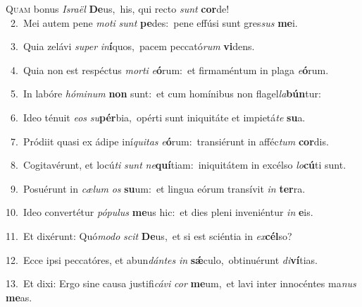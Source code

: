 \lettrine{\initial\textcolor{\initialcolor}{Q}}{uam} bonus \textit{Is}\-\textit{ra}\textit{ël} \textbf{De}\-us,~\star his, qui recto \textit{sunt} \textbf{cor}\-de!\\
{\numbfont\textcolor{\numbcolor}{~2.}}~Mei autem pene \textit{mo}\-\textit{ti} \textit{sunt} \textbf{pe}\-des:~\star pene effúsi sunt gres\textit{sus} \textbf{me}\-i.\par
{\numbfont\textcolor{\numbcolor}{~3.}}~Quia zelávi \textit{su}\-\textit{per} \textit{in}\-\textbf{í}quos,~\star pacem peccató\textit{rum} \textbf{vi}\-dens.\par
{\numbfont\textcolor{\numbcolor}{~4.}}~Quia non est respéctus \textit{mor}\-\textit{ti} \textit{e}\-\textbf{ó}rum:~\star et firmaméntum in plaga \textit{e}\-\textbf{ó}rum.\par
{\numbfont\textcolor{\numbcolor}{~5.}}~In labóre \textit{hó}\-\textit{mi}\textit{num} \textbf{non} sunt:~\star et cum homínibus non flagel\-\textit{la}\-\textbf{bún}tur:\par
{\numbfont\textcolor{\numbcolor}{~6.}}~Ideo ténuit \textit{e}\-\textit{os} \textit{su}\-\textbf{pér}bia,~\star opérti sunt iniquitáte et impietá\textit{te} \textbf{su}\-a.\par
{\numbfont\textcolor{\numbcolor}{~7.}}~Pródiit quasi ex ádipe iní\-\textit{qui}\-\textit{tas} \textit{e}\-\textbf{ó}rum:~\star transiérunt in afféc\textit{tum} \textbf{cor}\-dis.\par
{\numbfont\textcolor{\numbcolor}{~8.}}~Cogitavérunt, et locú\textit{ti} \textit{sunt} \textit{ne}\-\textbf{quí}tiam:~\star iniquitátem in excélso \textit{lo}\-\textbf{cú}ti sunt.\par
{\numbfont\textcolor{\numbcolor}{~9.}}~Posuérunt in \textit{cæ}\-\textit{lum} \textit{os} \textbf{su}\-um:~\star et lingua eórum transívit \textit{in} \textbf{ter}\-ra.\par
{\numbfont\textcolor{\numbcolor}{10.}}~Ideo convertétur \textit{pó}\-\textit{pu}\textit{lus} \textbf{me}\-us hic:~\star et dies pleni inveniéntur \textit{in} \textbf{e}\-is.\par
{\numbfont\textcolor{\numbcolor}{11.}}~Et dixérunt: Quó\-\textit{mo}\-\textit{do} \textit{scit} \textbf{De}\-us,~\star et si est sciéntia in \textit{ex}\-\textbf{cél}so?\par
{\numbfont\textcolor{\numbcolor}{12.}}~Ecce ipsi peccatóres, et abun\-\textit{dán}\-\textit{tes} \textit{in} \textbf{sǽ}\-culo,~\star obtinuérunt \textit{di}\-\textbf{ví}tias.\par
{\numbfont\textcolor{\numbcolor}{13.}}~Et dixi: Ergo sine causa justifi\-\textit{cá}\-\textit{vi} \textit{cor} \textbf{me}\-um,~\star et lavi inter innocéntes ma\textit{nus} \textbf{me}\-as.\par
